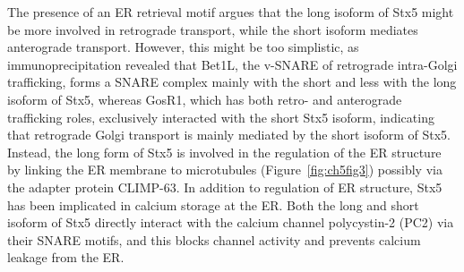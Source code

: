 The presence of an ER retrieval motif argues that the long isoform of Stx5 might be more involved in retrograde transport, while the short isoform mediates anterograde transport. However, this might be too simplistic, as immunoprecipitation revealed that Bet1L, the v-SNARE of retrograde intra-Golgi trafficking, forms a SNARE complex mainly with the short and less with the long isoform of Stx5, whereas GosR1, which has both retro- and anterograde trafficking roles, exclusively interacted with the short Stx5 isoform\cite{hay_mammalian_1996,shestakova_interaction_2007}, indicating that retrograde Golgi transport is mainly mediated by the short isoform of Stx5. Instead, the long form of Stx5 is involved in the regulation of the ER structure by linking the ER membrane to microtubules (Figure~\ref{fig:ch5fig3})\cite{miyazaki_contribution_2012} possibly via the adapter protein CLIMP-63\cite{miyazaki_contribution_2012,avci_intramembrane_2019}. In addition to regulation of ER structure, Stx5 has been implicated in calcium storage at the ER. Both the long and short isoform of Stx5 directly interact with the calcium channel polycystin-2 (PC2) via their SNARE motifs, and this blocks channel activity and prevents calcium leakage from the ER\cite{geng_syntaxin_2008}.

